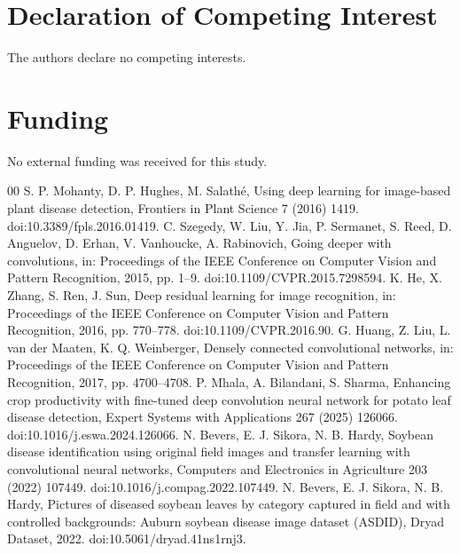 \documentclass[a4paper,fleqn]{cas-dc}
\begin{document}
\section*{Declaration of Competing Interest}
The authors declare no competing interests.

\section*{Funding}
No external funding was received for this study.


\begin{thebibliography}{00}
 S. P. Mohanty, D. P. Hughes, M. Salathé, Using deep learning for image-based plant disease detection, Frontiers in Plant Science 7 (2016) 1419. doi:10.3389/fpls.2016.01419.
 C. Szegedy, W. Liu, Y. Jia, P. Sermanet, S. Reed, D. Anguelov, D. Erhan, V. Vanhoucke, A. Rabinovich, Going deeper with convolutions, in: Proceedings of the IEEE Conference on Computer Vision and Pattern Recognition, 2015, pp. 1--9. doi:10.1109/CVPR.2015.7298594.
 K. He, X. Zhang, S. Ren, J. Sun, Deep residual learning for image recognition, in: Proceedings of the IEEE Conference on Computer Vision and Pattern Recognition, 2016, pp. 770--778. doi:10.1109/CVPR.2016.90.
 G. Huang, Z. Liu, L. van der Maaten, K. Q. Weinberger, Densely connected convolutional networks, in: Proceedings of the IEEE Conference on Computer Vision and Pattern Recognition, 2017, pp. 4700--4708.
 P. Mhala, A. Bilandani, S. Sharma, Enhancing crop productivity with fine-tuned deep convolution neural network for potato leaf disease detection, Expert Systems with Applications 267 (2025) 126066. doi:10.1016/j.eswa.2024.126066.
 N. Bevers, E. J. Sikora, N. B. Hardy, Soybean disease identification using original field images and transfer learning with convolutional neural networks, Computers and Electronics in Agriculture 203 (2022) 107449. doi:10.1016/j.compag.2022.107449.
 N. Bevers, E. J. Sikora, N. B. Hardy, Pictures of diseased soybean leaves by category captured in field and with controlled backgrounds: Auburn soybean disease image dataset (ASDID), Dryad Dataset, 2022. doi:10.5061/dryad.41ns1rnj3.
\end{thebibliography}
\end{document}
